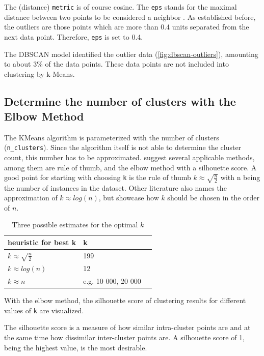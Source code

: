 The (distance) \lstinline|metric| is of course cosine. The \lstinline|eps| stands for the maximal distance between two points to be considered a neighbor \cite{SklearnClusterDBSCAN}. As established before, the outliers are those points which are more than 0.4 units separated from the next data point. Therefore, \lstinline|eps| is set to 0.4. 

The \ac{DBSCAN} model identified the outlier data (\ref{fig:dbscan-outliers}), amounting to about 3\% of the data points. These data points are not included into clustering by k-Means.

\subsection{Determine the number of clusters with the Elbow Method}
The KMeans algorithm is parameterized with the number of clusters (\lstinline|n_clusters|). Since the algorithm itself is not able to determine the cluster count, this number has to be approximated.
\cite{kodinariyaReviewDeterminingCluster2013} suggest several applicable methods, among them are rule of thumb, and the elbow method with a silhouette score.
A good point for starting with choosing \lstinline|k| is the rule of thumb $k \approx \sqrt{\frac{n}{2}}$ with n being the number of instances in the dataset. Other literature also names the approximation of $k \approx log(n)$, but \cite{maierOptimalConstructionKnearest2009} showcase how $k$ should be chosen in the order of $n$. 

\begin{table}[!h]
	\centering
	
	\begin{tabular}{l|ll}
		\toprule
		heuristic for best k                         & k &  \\
		\midrule
		$k \approx \sqrt{\frac{n}{2}}$ &  199 &  \\
		$k \approx log(n)$             & 12   &  \\
		$k \approx n$                  &  e.g. 10 000, 20 000& 
	\end{tabular}
\caption{Three possible estimates for the optimal $k$}
\label{table:heuristic-k}
\end{table}

With the elbow method, the silhouette score of clustering results for different values of \lstinline|k| are visualized. 

The silhouette score is a measure of how similar intra-cluster points are and at the same time how dissimilar inter-cluster points are. A silhouette score of 1, being the highest value, is the most desirable.

